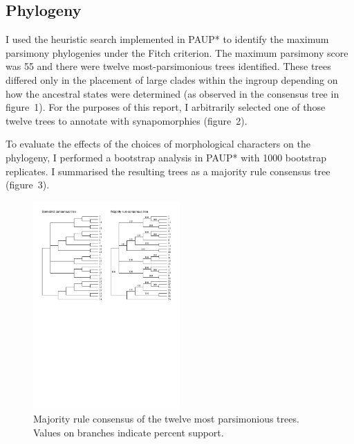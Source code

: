 \documentclass{article}
\begin{document}
        \subsection*{Phylogeny}

            I used the heuristic search implemented in PAUP* \cite{Swo02} to identify the maximum parsimony phylogenies under the Fitch criterion.
            The maximum parsimony score was 55 and there were twelve most-parsimonious trees identified.
            These trees differed only in the placement of large clades within the ingroup depending on how the ancestral states were determined (as observed in the consensus tree in figure~1).
            For the purposes of this report, I arbitrarily selected one of those twelve trees to annotate with synapomorphies (figure~2).

            To evaluate the effects of the choices of morphological characters
                on the phylogeny, I performed a bootstrap analysis in PAUP* with
                1000 bootstrap replicates.
            I summarised the resulting trees as a majority rule consensus tree (figure~3).

            \begin{figure}
                \centering
                \includegraphics[width=0.5\textwidth]{mp-consensus.pdf}
                \caption{Majority rule consensus of the twelve most parsimonious trees. Values on branches indicate percent support.}
            \end{figure}
            
\end{document}
